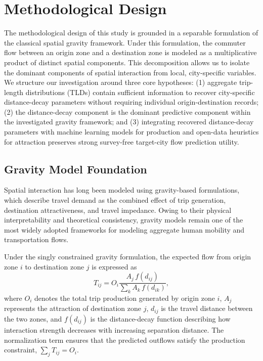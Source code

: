 \section{Methodological Design}\label{sec:methodology}

The methodological design of this study is grounded in a separable formulation of the classical spatial gravity framework. Under this formulation, the commuter flow between an origin zone and a destination zone is modeled as a multiplicative product of distinct spatial components. This decomposition allows us to isolate the dominant components of spatial interaction from local, city-specific variables. We structure our investigation around three core hypotheses: (1) aggregate trip-length distributions (TLDs) contain sufficient information to recover city-specific distance-decay parameters without requiring individual origin-destination records; (2) the distance-decay component is the dominant predictive component within the investigated gravity framework; and (3) integrating recovered distance-decay parameters with machine learning models for production and open-data heuristics for attraction preserves strong survey-free target-city flow prediction utility.

\subsection{Gravity Model Foundation}\label{sec:gravity_foundation}

Spatial interaction has long been modeled using gravity-based formulations, which describe travel demand as the combined effect of trip generation, destination attractiveness, and travel impedance. Owing to their physical interpretability and theoretical consistency, gravity models remain one of the most widely adopted frameworks for modeling aggregate human mobility and transportation flows.

Under the singly constrained gravity formulation, the expected flow from origin zone $i$ to destination zone $j$ is expressed as
\begin{equation}\label{eq:decomposition}
T_{ij} = O_i \frac{A_j\, f(d_{ij})}{\sum_{k} A_k\, f(d_{ik})},
\end{equation}
where $O_i$ denotes the total trip production generated by origin zone $i$, $A_j$ represents the attraction of destination zone $j$, $d_{ij}$ is the travel distance between the two zones, and $f(d_{ij})$ is the distance-decay function describing how interaction strength decreases with increasing separation distance. The normalization term ensures that the predicted outflows satisfy the production constraint, $\sum_{j} T_{ij} = O_i$.

